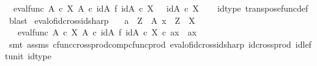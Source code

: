 \begin{isabellebody}
\ \ {\isachardoublequoteopen}{\isacharparenleft}{\kern0pt}eval{\isacharunderscore}{\kern0pt}func\ {\isacharparenleft}{\kern0pt}A\ {\isasymtimes}\isactrlsub c\ X{\isacharparenright}{\kern0pt}\ A{\isacharparenright}{\kern0pt}\ {\isasymcirc}\isactrlsub c\ {\isacharparenleft}{\kern0pt}id{\isacharparenleft}{\kern0pt}A{\isacharparenright}{\kern0pt}\ {\isasymtimes}\isactrlsub f\ {\isacharparenleft}{\kern0pt}id{\isacharparenleft}{\kern0pt}A\ {\isasymtimes}\isactrlsub c\ X{\isacharparenright}{\kern0pt}{\isacharparenright}{\kern0pt}\isactrlsup {\isasymsharp}{\isacharparenright}{\kern0pt}\ \ {\isacharequal}{\kern0pt}\ id{\isacharparenleft}{\kern0pt}A\ {\isasymtimes}\isactrlsub c\ X{\isacharparenright}{\kern0pt}{\isachardoublequoteclose}\isanewline
%
\isadelimproof
\ \ %
\endisadelimproof
%
\isatagproof
{}\isamarkupfalse%
\ id{\isacharunderscore}{\kern0pt}type\ transpose{\isacharunderscore}{\kern0pt}func{\isacharunderscore}{\kern0pt}def\ \isamarkupfalse%
\ blast%
\endisatagproof
{\isafoldproof}%
%
\isadelimproof
\isanewline
%
\endisadelimproof
{}\isamarkupfalse%
\ eval{\isacharunderscore}{\kern0pt}of{\isacharunderscore}{\kern0pt}id{\isacharunderscore}{\kern0pt}cross{\isacharunderscore}{\kern0pt}id{\isacharunderscore}{\kern0pt}sharp{}{\isacharcolon}{\kern0pt}\isanewline
\ \ \ {\isachardoublequoteopen}a\ {\isacharcolon}{\kern0pt}\ Z\ {\isasymrightarrow}\ A{\isachardoublequoteclose}\ {\isachardoublequoteopen}x\ {\isacharcolon}{\kern0pt}\ Z\ {\isasymrightarrow}\ X{\isachardoublequoteclose}\isanewline
\ \ \ {\isachardoublequoteopen}{\isacharparenleft}{\kern0pt}{\isacharparenleft}{\kern0pt}eval{\isacharunderscore}{\kern0pt}func\ {\isacharparenleft}{\kern0pt}A\ {\isasymtimes}\isactrlsub c\ X{\isacharparenright}{\kern0pt}\ A{\isacharparenright}{\kern0pt}\ {\isasymcirc}\isactrlsub c\ {\isacharparenleft}{\kern0pt}id{\isacharparenleft}{\kern0pt}A{\isacharparenright}{\kern0pt}\ {\isasymtimes}\isactrlsub f\ {\isacharparenleft}{\kern0pt}id{\isacharparenleft}{\kern0pt}A\ {\isasymtimes}\isactrlsub c\ X{\isacharparenright}{\kern0pt}{\isacharparenright}{\kern0pt}\isactrlsup {\isasymsharp}{\isacharparenright}{\kern0pt}{\isacharparenright}{\kern0pt}\ {\isasymcirc}\isactrlsub c\ {\isasymlangle}a{\isacharcomma}{\kern0pt}x{\isasymrangle}\ {\isacharequal}{\kern0pt}\ {\isasymlangle}a{\isacharcomma}{\kern0pt}x{\isasymrangle}{\isachardoublequoteclose}\isanewline
%
\isadelimproof
\ \ %
\endisadelimproof
%
\isatagproof
{}\isamarkupfalse%
\ {\isacharparenleft}{\kern0pt}smt\ assms\ cfunc{\isacharunderscore}{\kern0pt}cross{\isacharunderscore}{\kern0pt}prod{\isacharunderscore}{\kern0pt}comp{\isacharunderscore}{\kern0pt}cfunc{\isacharunderscore}{\kern0pt}prod\ eval{\isacharunderscore}{\kern0pt}of{\isacharunderscore}{\kern0pt}id{\isacharunderscore}{\kern0pt}cross{\isacharunderscore}{\kern0pt}id{\isacharunderscore}{\kern0pt}sharp{}\ id{\isacharunderscore}{\kern0pt}cross{\isacharunderscore}{\kern0pt}prod\ id{\isacharunderscore}{\kern0pt}left{\isacharunderscore}{\kern0pt}unit{}\ id{\isacharunderscore}{\kern0pt}type{\isacharparenright}{\kern0pt}%

\end{isabellebody}
